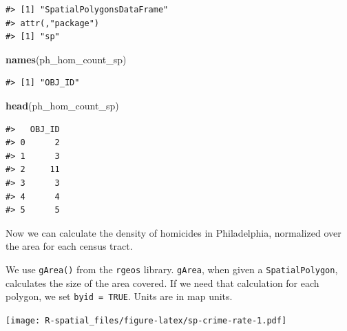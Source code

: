 \documentclass[]{book}
\newenvironment{Shaded}{\begin{snugshade}}{\end{snugshade}}
\newcommand{\KeywordTok}[1]{\textcolor[rgb]{0.13,0.29,0.53}{\textbf{#1}}}
\newcommand{\DataTypeTok}[1]{\textcolor[rgb]{0.13,0.29,0.53}{#1}}
\newcommand{\FloatTok}[1]{\textcolor[rgb]{0.00,0.00,0.81}{#1}}
\newcommand{\StringTok}[1]{\textcolor[rgb]{0.31,0.60,0.02}{#1}}
\newcommand{\CommentTok}[1]{\textcolor[rgb]{0.56,0.35,0.01}{\textit{#1}}}
\newcommand{\OtherTok}[1]{\textcolor[rgb]{0.56,0.35,0.01}{#1}}
\newcommand{\OperatorTok}[1]{\textcolor[rgb]{0.81,0.36,0.00}{\textbf{#1}}}
\newcommand{\NormalTok}[1]{#1}
\theoremstyle{definition}
\theoremstyle{definition}
\theoremstyle{definition}
\theoremstyle{remark}
\begin{document}
\begin{verbatim}
#> [1] "SpatialPolygonsDataFrame"
#> attr(,"package")
#> [1] "sp"
\end{verbatim}

\begin{Shaded}
\begin{Highlighting}[]
\KeywordTok{names}\NormalTok{(ph_hom_count_sp)}
\end{Highlighting}
\end{Shaded}

\begin{verbatim}
#> [1] "OBJ_ID"
\end{verbatim}

\begin{Shaded}
\begin{Highlighting}[]
\KeywordTok{head}\NormalTok{(ph_hom_count_sp)}
\end{Highlighting}
\end{Shaded}

\begin{verbatim}
#>   OBJ_ID
#> 0      2
#> 1      3
#> 2     11
#> 3      3
#> 4      4
#> 5      5
\end{verbatim}

Now we can calculate the density of homicides in Philadelphia,
normalized over the area for each census tract.

We use \texttt{gArea()} from the \texttt{rgeos} library. \texttt{gArea},
when given a \texttt{SpatialPolygon}, calculates the size of the area
covered. If we need that calculation for each polygon, we set
\texttt{byid\ =\ TRUE}. Units are in map units.

\begin{Shaded}
\end{Shaded}

\texttt{[image: R-spatial\_files/figure-latex/sp-crime-rate-1.pdf]}
\end{document}
